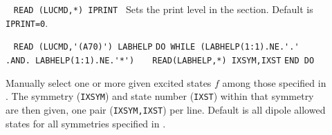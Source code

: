 \begin{description}
%
%
%
%
\item[] \verb| |\newline
\verb|READ (LUCMD,*) IPRINT |\newline
Sets the print level in the  section. Default is \verb+IPRINT=0+.
%
\item[] \verb| |\newline 
\verb|READ (LUCMD,'(A70)') LABHELP|\newline
\verb|DO WHILE (LABHELP(1:1).NE.'.' .AND. LABHELP(1:1).NE.'*')|\newline
\verb|   READ(LABHELP,*) IXSYM,IXST|\newline
\verb|END DO|

Manually select one or more given excited states $f$ among those specified
in . 
The symmetry (\verb+IXSYM+) and state number (\verb+IXST+)
within that symmetry are then given,
one pair (\verb|IXSYM,IXST|) per line.
Default is all dipole allowed states for all symmetries 
specified in .
%
%
%
%
%
%
%
\end{description}
